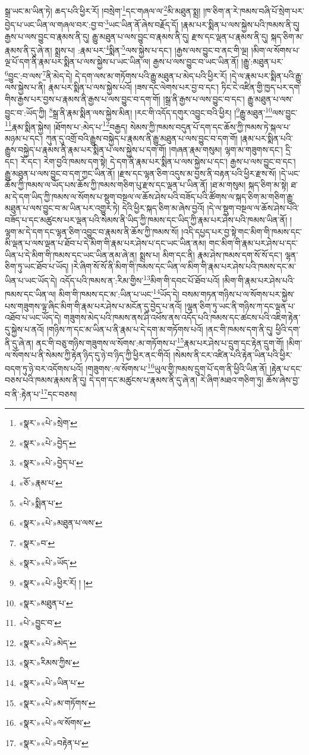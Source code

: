 སྒྲ་ཡང་མ་ཡིན་ཏེ། ཆད་པའི་ཕྱིར་རོ། །བསྲེག་\footnote{«སྣར་»«པེ་»སྲེག་}དང་གཞལ་ལ་\footnote{«སྣར་»«པེ་»བྱེད་}མི་མཐུན་སྨྲ། །ཁ་ཅིག་ན་རེ་ཁམས་བཞི་པོ་སྲེག་པར་བྱེད་པ་ཡང་ཡིན་ལ་གཞལ་བར་:བྱ་བ་\footnote{«སྣར་»«པེ་»བྱེད་པ་}ཡང་ཡིན་ནོ་ཞེས་བརྗོད་དོ། །རྣམ་པར་སྨིན་པ་ལས་སྐྱེས་པའི་ཁམས་ནི་དུ། རྒྱས་པ་ལས་བྱུང་བ་རྣམས་ནི་དུ། རྒྱུ་མཐུན་པ་ལས་བྱུང་བ་རྣམས་ནི་དུ། རྫས་དང་ལྡན་པ་རྣམས་ནི་དུ། སྐད་ཅིག་མ་རྣམས་ནི་དུ་ཞེ་ན། སྨྲས་པ། :རྣམ་པར་\footnote{«ཅོ་»རྣམ་པ་}སྨིན་\footnote{«པེ་»སྨིན་པ་}ལས་སྐྱེས་པ་དང་། །རྒྱས་ལས་བྱུང་བ་ནང་གི་ལྔ། །མིག་ལ་སོགས་པ་ལྔ་པོ་དག་ནི་རྣམ་པར་སྨིན་པ་ལས་སྐྱེས་པ་ཡང་ཡིན་ལ། རྒྱས་པ་ལས་བྱུང་བ་ཡང་ཡིན་ནོ། །རྒྱུ་:མཐུན་པར་\footnote{«སྣར་»«པེ་»མཐུན་པ་ལས་}བྱུང་:བ་ལས་\footnote{«སྣར་»བ་}ནི་མེད་དེ། དེ་དག་ལས་མ་གཏོགས་པའི་རྒྱུ་མཐུན་པ་མེད་པའི་ཕྱིར་རོ། །དེ་ལ་རྣམ་པར་སྨིན་པའི་རྒྱུ་ལས་སྐྱེས་པ་ནི། རྣམ་པར་སྨིན་པ་ལས་སྐྱེས་པའོ། །ཟས་དང་ལེགས་པར་བྱ་བ་དང་། ཏིང་ངེ་འཛིན་གྱི་ཁྱད་པར་དག་གིས་རྒྱས་པར་བྱས་པ་རྣམས་ནི་རྒྱས་པ་ལས་བྱུང་བ་དག་གོ། །སྒྲ་ནི་རྒྱས་པ་ལས་བྱུང་བ་དང་། རྒྱུ་མཐུན་པ་ལས་བྱུང་བ་:ཡོད་ཀྱི། \footnote{«སྣར་»«པེ་»ཡོད་}སྒྲ་ནི་རྣམ་སྨིན་ལས་སྐྱེས་མིན། །རང་གི་འདོད་དགུར་འབྱུང་བའི་ཕྱིར། །\footnote{«སྣར་»«པེ་»ཕྱིར་རོ། ། །}རྒྱུ་མཐུན་\footnote{«སྣར་»མཐུན་པ་}ལས་བྱུང་\footnote{«པེ་»བྱུང་བ་}རྣམ་སྨིན་སྐྱེས། །ཐོགས་པ་:མེད་པ་\footnote{«སྣར་»«པེ་»མེད་}བརྒྱད། སེམས་ཀྱི་ཁམས་བདུན་པོ་དག་དང་ཆོས་ཀྱི་ཁམས་ཏེ་སྐལ་པ་མཉམ་པ་དང་། ཀུན་དུ་འགྲོ་བའི་རྒྱུས་བསྐྱེད་པ་རྣམས་ནི་རྒྱུ་མཐུན་པ་ལས་བྱུང་བ་དག་གོ། །རྣམ་པར་སྨིན་པའི་རྒྱུས་བསྐྱེད་པ་རྣམས་ནི་རྣམ་པར་སྨིན་པ་ལས་སྐྱེས་པ་དག་གོ། །གཞན་རྣམ་གསུམ། ལྷག་མ་གཟུགས་དང་། དྲི་དང་། རོ་དང་། རེག་བྱའི་ཁམས་དག་སྟེ། དེ་དག་ནི་རྣམ་པར་སྨིན་པ་ལས་སྐྱེས་པ་དང་། རྒྱས་པ་ལས་བྱུང་བ་དང་། རྒྱུ་མཐུན་པ་ལས་བྱུང་བ་དག་ཀྱང་ཡིན་ནོ། །རྫས་དང་ལྷན་ཅིག་འདུས་མ་བྱས་ནི་བརྟན་པའི་ཕྱིར་རྫས་སོ། །དེ་ཡང་ཆོས་ཀྱི་ཁམས་ལ་ཡོད་པས་ཆོས་ཀྱི་ཁམས་གཅིག་པུ་རྫས་དང་ལྡན་པ་ཡིན་ནོ། །ཐ་མ་གསུམ། སྐད་ཅིག་མ་སྟེ། ཐ་མ་དེ་དག་ཡིད་ཀྱི་ཁམས་ལ་སོགས་པ་སྡུག་བསྔལ་ལ་ཆོས་ཤེས་པའི་བཟོད་པའི་ཚོགས་ལ་སྐད་ཅིག་མ་གཅིག་རྒྱུ་མཐུན་པ་ལས་བྱུང་བ་མ་ཡིན་པར་འགྱུར་ཏེ། དེའི་ཕྱིར་སྐད་ཅིག་མ་ཞེས་བྱའོ། །དེ་ལ་སྡུག་བསྔལ་ལ་ཆོས་ཤེས་པའི་བཟོད་པ་དང་མཚུངས་པར་ལྡན་པའི་སེམས་ནི་ཡིད་ཀྱི་ཁམས་དང་ཡིད་ཀྱི་རྣམ་པར་ཤེས་པའི་ཁམས་ཡིན་ནོ། །ལྷག་མ་དེ་དག་དང་ལྷན་ཅིག་འབྱུང་བ་རྣམས་ནི་ཆོས་ཀྱི་ཁམས་སོ། །འདི་དཔྱད་པར་བྱ་སྟེ་གང་མིག་གི་ཁམས་དང་མི་ལྡན་པ་ལས་ལྡན་པ་ཐོབ་པ་དེ་མིག་གི་རྣམ་པར་ཤེས་པ་དང་ཡང་ཡིན་ནམ། གང་མིག་གི་རྣམ་པར་ཤེས་པ་དང་ཡིན་པ་དེ་མིག་གི་ཁམས་དང་ཡང་ཡིན་ནམ་ཞེ་ན། སྨྲས་པ། མིག་དང་ནི། རྣམ་ཤེས་ཁམས་དག་སོ་སོ་དང་། ལྷན་ཅིག་ཏུ་ཡང་ཐོབ་པ་ཡོད། །རེ་ཞིག་སོ་སོ་ནི་མིག་གི་ཁམས་དང་ཡིན་ལ་མིག་གི་རྣམ་པར་ཤེས་པའི་ཁམས་དང་མ་ཡིན་པ་ཡང་ཡོད་དེ། འདོད་པའི་ཁམས་ན་:རིམ་གྱིས་\footnote{«སྣར་»རིམས་ཀྱིས་}མིག་གི་དབང་པོ་ཐོབ་པའོ། །མིག་གི་རྣམ་པར་ཤེས་པའི་ཁམས་དང་ཡིན་ལ། མིག་གི་ཁམས་དང་མ་:ཡིན་པ་ཡང་\footnote{«སྣར་»«པེ་»ཡིན་པ་}ཡོད་དེ། བསམ་གཏན་གཉིས་པ་ལ་སོགས་པར་སྐྱེས་པས་གཟུགས་ལྟ་ཞིང་མིག་གི་རྣམ་པར་ཤེས་པ་མངོན་དུ་བྱེད་པ་ནའོ། །ལྷན་ཅིག་ཏུ་ཡང་ནི་གཉིས་ཀ་དང་ལྡན་པ་འཐོབ་པ་ཡང་ཡོད་དེ། གཟུགས་མེད་པའི་ཁམས་ནས་ཤི་འཕོས་ནས་འདོད་པའི་ཁམས་དང་ཚངས་པའི་འཇིག་རྟེན་དུ་སྐྱེས་པ་ནའོ། །གཉིས་ཀ་དང་མ་ཡིན་པ་ནི་རྣམ་པ་དེ་དག་མ་གཏོགས་པའོ། །ནང་གི་ཁམས་དག་ནི་དུ། ཕྱིའི་དག་ནི་དུ་ཞེ་ན། ནང་གི་བཅུ་གཉིས་གཟུགས་ལ་སོགས་:མ་གཏོགས་པ་\footnote{«སྣར་»«པེ་»མ་གཏོགས་}རྣམ་པར་ཤེས་པ་དྲུག་དང་རྟེན་དྲུག་གོ། །མིག་ལ་སོགས་པ་ནི་སེམས་ཀྱི་རྟེན་ཉིད་དུ་ཉེ་བ་ཉིད་ཀྱི་ཕྱིར་ནང་གིའོ། །སེམས་ནི་ངར་འཛིན་པའི་རྟེན་ཡིན་པའི་ཕྱིར་བདག་ཏུ་ཉེ་བར་འདོགས་པའོ། །གཟུགས་:ལ་སོགས་པ་\footnote{«སྣར་»«པེ་»ལ་སོགས་}ཡུལ་གྱི་ཁམས་དྲུག་པོ་དག་ནི་ཕྱིའི་ཡིན་ནོ། །རྟེན་པ་དང་བཅས་པའི་ཁམས་རྣམས་ནི་དུ། དེ་དག་དང་མཚུངས་པ་རྣམས་ནི་དུ་ཞེ་ན། རེ་ཞིག་མཐའ་གཅིག་ཏུ། ཆོས་ཞེས་བྱ་བ་ནི་:རྟེན་པ་\footnote{«སྣར་»«པེ་»བརྟེན་པ་}དང་བཅས། 